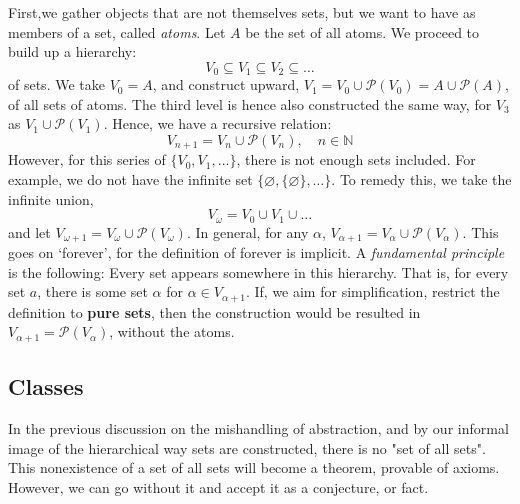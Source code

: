 First,we gather objects that are not themselves sets, but we want to have as members of a set, called \textit{atoms}. Let $A$ be the set of all atoms.  We proceed to build up a hierarchy: \begin{equation*}
    V_{0} \subseteq V_{1} \subseteq V_{2} \subseteq \dots
\end{equation*}
of sets. We take $V_{0}=A$, and construct upward, $V_{1}=V_{0}\cup \mathcal{P}(V_{0})=A\cup \mathcal{P}(A)$, of all sets of atoms. The third level is hence also constructed the same way, for $V_{3}$ as $V_{1}\cup \mathcal{P}(V_{1})$. Hence, we have a recursive relation: \begin{equation}
    V_{n+1}= V_{n} \cup \mathcal{P}(V_{n}), \quad n \in \mathbb{N}
\end{equation}
However, for this series of $\{V_{0},V_{1},\dots\}$, there is not enough sets included. For example, we do not have the infinite set $\{\varnothing, \{\varnothing\},\dots\}$. To remedy this, we take the infinite union, \begin{equation*}
    V_{\omega} = V_{0} \cup V_{1}\cup \dots
\end{equation*}
and let $V_{\omega+1}=V_{\omega}\cup \mathcal{P}(V_{\omega})$. In general, for any $\alpha$, $V_{\alpha+1}= V_{\alpha}\cup \mathcal{P}(V_{\alpha})$. This goes on `forever', for the definition of forever is implicit. A \textit{fundamental principle} is the following: Every set appears somewhere in this hierarchy. That is, for every set $a$, there is some set $\alpha$ for $\alpha \in V_{\alpha+1}$. If, we aim for simplification, restrict the definition to \textbf{pure sets}, then the construction would be resulted in $V_{\alpha+1}=\mathcal{P}(V_{\alpha})$, without the atoms. 
\subsection{Classes}

In the previous discussion on the mishandling of abstraction, and by our informal image of the hierarchical way sets are constructed, there is no "set of all sets". This nonexistence of a set of all sets will become a theorem, provable of axioms. However, we can go without it and accept it as a conjecture, or fact. 

